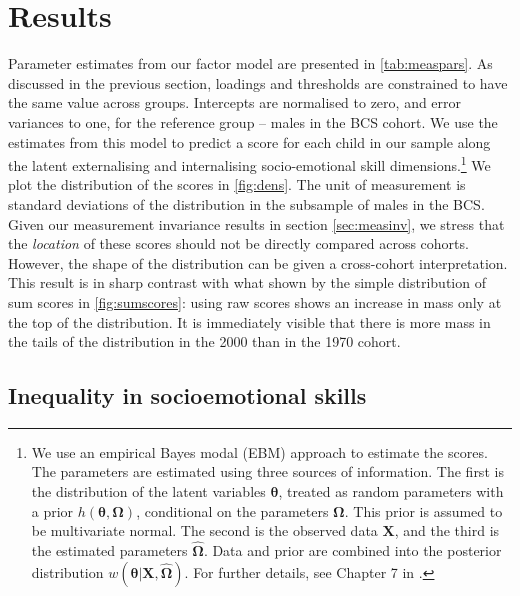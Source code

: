 

\section{Results}\label{sec:results}

Parameter estimates from our factor model are presented in \autoref{tab:measpars}. As discussed in the previous section, loadings and thresholds are constrained to have the same value across groups. Intercepts are normalised to zero, and error variances to one, for the reference group -- males in the BCS cohort. We use the estimates from this model to predict a score for each child in our sample along the latent externalising and internalising socio-emotional skill dimensions.\footnote{We use an empirical Bayes modal (EBM) approach to estimate the scores. The parameters are estimated using three sources of information. The first is the distribution of the latent variables $\bm{\theta}$, treated as random parameters with a prior $h(\bm{\theta}, \bm{\Omega})$, conditional on the parameters $\bm{\Omega}$. This prior is assumed to be multivariate normal. The second is the observed data $\bm{X}$, and the third is the estimated parameters $\hat{\bm{\Omega}}$. Data and prior are combined into the posterior distribution $w(\bm{\theta}| \bm{X}, \hat{\bm{\Omega}})$. For further details, see Chapter 7 in \citet{Skrondal2004}.} We plot the distribution of the scores in \autoref{fig:dens}. The unit of measurement is standard deviations of the distribution in the subsample of males in the BCS. Given our measurement invariance results in section \ref{sec:measinv}, we stress that the \emph{location} of these scores should not be directly compared across cohorts. However, the shape of the distribution can be given a cross-cohort interpretation. This result is in sharp contrast with what shown by the simple distribution of sum scores in \ref{fig:sumscores}: using raw scores shows an increase in mass only at the top of the distribution. It is immediately visible that there is more mass in the tails of the distribution in the 2000 than in the 1970 cohort.

\subsection{Inequality in socioemotional skills}

